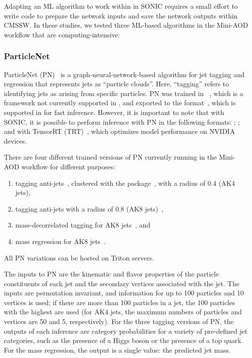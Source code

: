 Adapting an ML algorithm to work within in SONIC requires a small effort to write code to prepare the network inputs and save the network outputs within CMSSW. In these studies, we tested three ML-based algorithms in the Mini-AOD workflow that are computing-intensive:

\subsubsection{ParticleNet}
\label{sec:PN}

ParticleNet (PN)~\cite{Qu:2019gqs} is a graph-neural-network-based algorithm for jet tagging and regression that represents jets as ``particle clouds''. Here, ``tagging'' refers to identifying jets as arising from specific particles. PN was trained in \PYTORCH~\cite{pytorch}, which is a framework not currently supported in \CMSSW, and exported to the \ONNX format~\cite{onnx}, which is supported in \CMSSW for fast inference. However, it is important to note that with SONIC, it is possible to perform inference with PN in the following formats: \ONNX; \PYTORCH; and \PYTORCH with TensorRT (TRT)~\cite{tensorRT}, which optimizes model performance on NVIDIA devices.

There are four different trained versions of PN currently running in the Mini-AOD workflow for different purposes:
\begin{enumerate}
    \item tagging anti-\kt jets~\cite{Cacciari:2008gp}, clustered with the \FASTJET package~\cite{Cacciari:2011ma}, with a radius of 0.4 (AK4 jets),
    \item tagging anti-\kt jets with a radius of 0.8 (AK8 jets)~\cite{Sirunyan:2020lcu},
    \item mass-decorrelated tagging for AK8 jets~\cite{Sirunyan:2020lcu}, and
    \item mass regression for AK8 jets~\cite{CMS-DP-2021-017}.
\end{enumerate}
All PN variations can be hosted on Triton servers.

The inputs to PN are the kinematic and flavor properties of the particle constituents of each jet and the secondary vertices associated with the jet. The inputs are permutation invariant, and information for up to 100 particles and 10 vertices is used; if there are more than 100 particles in a jet, the 100 particles with the highest \pt are used (for AK4 jets, the maximum numbers of particles and vertices are 50 and 5, respectively). For the three tagging versions of PN, the outputs of each inference are category probabilities for a variety of pre-defined jet categories, such as the presence of a Higgs boson or the presence of a top quark. For the mass regression, the output is a single value: the predicted jet mass.

